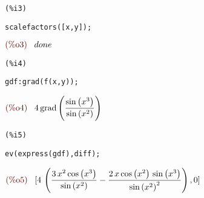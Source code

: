\documentclass[12pt]{article}
\begin{document}
\noindent
\begin{minipage}[t]{8ex}{\color{red}\bf
\begin{verbatim}
(%i3) 
\end{verbatim}}
\end{minipage}
\begin{minipage}[t]{\textwidth}{\color{blue}
\begin{verbatim}
scalefactors([x,y]);
\end{verbatim}}
\end{minipage}
\begin{math}\displaystyle
\parbox{8ex}{\color{labelcolor}(\%o3) }
done
\end{math}


\noindent
\begin{minipage}[t]{8ex}{\color{red}\bf
\begin{verbatim}
(%i4) 
\end{verbatim}}
\end{minipage}
\begin{minipage}[t]{\textwidth}{\color{blue}
\begin{verbatim}
gdf:grad(f(x,y));
\end{verbatim}}
\end{minipage}
\begin{math}\displaystyle
\parbox{8ex}{\color{labelcolor}(\%o4) }
4\,\mathrm{grad}\left( \frac{\mathrm{sin}\left( {x}^{3}\right) }{\mathrm{sin}\left( {x}^{2}\right) }\right) 
\end{math}


\noindent
\begin{minipage}[t]{8ex}{\color{red}\bf
\begin{verbatim}
(%i5) 
\end{verbatim}}
\end{minipage}
\begin{minipage}[t]{\textwidth}{\color{blue}
\begin{verbatim}
ev(express(gdf),diff);
\end{verbatim}}
\end{minipage}
\begin{math}\displaystyle
\parbox{8ex}{\color{labelcolor}(\%o5) }
[4\,\left( \frac{3\,{x}^{2}\,\mathrm{cos}\left( {x}^{3}\right) }{\mathrm{sin}\left( {x}^{2}\right) }-\frac{2\,x\,\mathrm{cos}\left( {x}^{2}\right) \,\mathrm{sin}\left( {x}^{3}\right) }{{\mathrm{sin}\left( {x}^{2}\right) }^{2}}\right) ,0]
\end{math}
\end{document}

